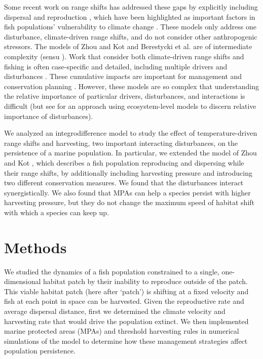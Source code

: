 \documentclass[]{article}
\begin{document}
Some recent work on range shifts has addressed these gaps by explicitly including dispersal and reproduction \citep{Berestyckietal2009, ZhouKot2011}, which have been highlighted as important factors in fish populations' vulnerability to climate change \citep{Fordhametal2013, Hastingsetal2005}.  These models only address one disturbance, climate-driven range shifts, and do not consider other anthropogenic stressors.  The models of Zhou and Kot
\citep{ZhouKot2011} and Berestycki et al. \citep{Berestyckietal2009} are of
intermediate complexity (sensu
\citep{Gaylordetal2005}).  Work that consider both climate-driven
range shifts and fishing is often case-specific and detailed, including
multiple drivers and disturbances \citep{Cheungetal2010, Lindegrenetal2010, Brownetal2010, Merinoetal2010, Merinoetal2010b, Plaganyietal2011, Ainsworthetal2011, Zhangetal2011,
Barangeetal2011, Howardetal2013}. These cumulative
impacts are important for management and conservation planning
\citep{Allisonetal2009}.  However, these models are
so complex that understanding the relative importance of particular
drivers, disturbances, and interactions is difficult (but see
\citep{Nyeetal2013} for an approach using ecosystem-level models to discern
relative importance of disturbances).  

We analyzed an integrodifference model to study the effect of temperature-driven range shifts and
harvesting, two important interacting disturbances, on the persistence of a marine population. In particular, we extended the model of
Zhou and Kot \citep{ZhouKot2011}, which describes a fish population
reproducing and dispersing while their range shifts, by
additionally including harvesting pressure and introducing two different
conservation measures. We found that the disturbances interact
synergistically. We also found that MPAs can help a species persist with
higher harvesting pressure, but they do not change the maximum speed of
habitat shift with which a species can keep up.


\section{Methods}

We studied the dynamics of a fish population constrained to a single, one-dimensional habitat patch by their inability to reproduce outside of the patch.  This viable habitat patch (here after `patch') is shifting at a fixed velocity and fish at each point in space can be harvested.  Given the reproductive rate and average dispersal distance, first we determined the climate velocity and harvesting rate that would drive the population extinct.  We then implemented marine protected areas (MPAs) and threshold harvesting rules in numerical simulations of the model to 
determine how these management strategies affect population persistence.
\end{document}
